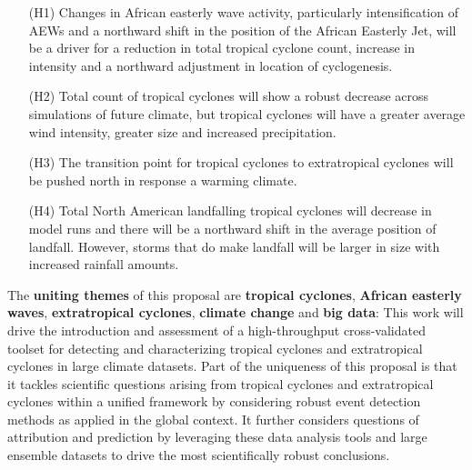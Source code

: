 \documentclass[11pt]{article}
\begin{document}
\vspace{-0.4cm}
\begin{itemize}

\item[(H1)] Changes in African easterly wave activity, particularly intensification of AEWs and a northward shift in the position of the African Easterly Jet, will be a driver for a reduction in total tropical cyclone count, increase in intensity and a northward adjustment in location of cyclogenesis.

\item[(H2)] Total count of tropical cyclones will show a robust decrease across simulations of future climate, but tropical cyclones will have a greater average wind intensity, greater size and increased precipitation.  

\item[(H3)] The transition point for tropical cyclones to extratropical cyclones will be pushed north in response a warming climate.

\item[(H4)] Total North American landfalling tropical cyclones will decrease in model runs and there will be a northward shift in the average position of landfall. However, storms that do make landfall will be larger in size with increased rainfall amounts.
\end{itemize}

The \textbf{uniting themes} of this proposal are \textbf{tropical cyclones}, \textbf{African easterly waves}, \textbf{extratropical cyclones}, \textbf{climate change} and \textbf{big data}: This work will drive the introduction and assessment of a high-throughput cross-validated toolset for detecting and characterizing tropical cyclones and extratropical cyclones in large climate datasets.  Part of the uniqueness of this proposal is that it tackles scientific questions arising from tropical cyclones and extratropical cyclones within a unified framework by considering robust event detection methods as applied in the global context.  It further considers questions of attribution and prediction by leveraging these data analysis tools and large ensemble datasets to drive the most scientifically robust conclusions.
\end{document}
